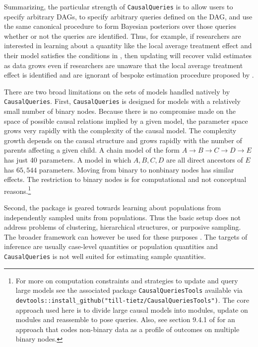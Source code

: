 \documentclass[
  11pt,
  article]{jss}
\begin{document}
Summarizing, the particular strength of \texttt{CausalQueries} is to
allow users to specify arbitrary DAGs, to specify arbitrary queries
defined on the DAG, and use the same canonical procedure to form
Bayesian posteriors over those queries whether or not the queries are
identified. Thus, for example, if researchers are interested in learning
about a quantity like the local average treatment effect and their model
satisfies the conditions in \citet{angrist_identification_1996}, then
updating will recover valid estimates as data grows even if researchers
are unaware that the local average treatment effect is identified and
are ignorant of bespoke estimation procedure proposed by
\citet{angrist_identification_1996}.

There are two broad limitations on the sets of models handled natively
by \texttt{CausalQueries}. First, \texttt{CausalQueries} is designed for
models with a relatively small number of binary nodes. Because there is
no compromise made on the space of possible causal relations implied by
a given model, the parameter space grows very rapidly with the
complexity of the causal model. The complexity growth depends on the
causal structure and grows rapidly with the number of parents affecting
a given child. A chain model of the form
\(A \rightarrow B \rightarrow C \rightarrow D \rightarrow E\) has just
40 parameters. A model in which \(A, B, C, D\) are all direct ancestors
of \(E\) has \(65,544\) parameters. Moving from binary to nonbinary
nodes has similar effects. The restriction to binary nodes is for
computational and not conceptual reasons.\footnote{For more on
  computation constraints and strategies to update and query large
  models see the associated package \texttt{CausalQueriesTools}
  available via
  \texttt{devtools::install\_github("till-tietz/CausalQueriesTools")}.
  The core approach used here is to divide large causal models into
  modules, update on modules and reassemble to pose queries. Also, see
  section 9.4.1 of \citet{humphreys_integrated_2023} for an approach
  that codes non-binary data as a profile of outcomes on multiple binary
  nodes.}

Second, the package is geared towards learning about populations from
independently sampled units from populations. Thus the basic setup does
not address problems of clustering, hierarchical structures, or
purposive sampling. The broader framework can however be used for these
purposes \citep[see section 9.4 of][]{humphreys_integrated_2023}. The
targets of inference are usually case-level quantities or population
quantities and \texttt{CausalQueries} is not well suited for estimating
sample quantities.
\end{document}

